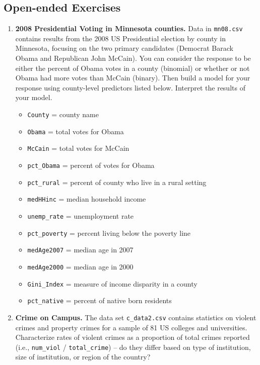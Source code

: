\documentclass[
]{krantz}
\providecommand{\tightlist}{%
  \setlength{\itemsep}{0pt}\setlength{\parskip}{0pt}}
\begin{document}
\hypertarget{open-ended-exercises-1}{%
\subsection{Open-ended Exercises}\label{open-ended-exercises-1}}

\begin{enumerate}
\def\labelenumi{\arabic{enumi}.}
\item
  \textbf{2008 Presidential Voting in Minnesota counties.} Data in \texttt{mn08.csv} contains results from the 2008 US Presidential election by county in Minnesota, focusing on the two primary candidates (Democrat Barack Obama and Republican John McCain). You can consider the response to be either the percent of Obama votes in a county (binomial) or whether or not Obama had more votes than McCain (binary). Then build a model for your response using county-level predictors listed below. Interpret the results of your model.

  \begin{itemize}
  \tightlist
  \item
    \texttt{County} = county name
  \item
    \texttt{Obama} = total votes for Obama
  \item
    \texttt{McCain} = total votes for McCain
  \item
    \texttt{pct\_Obama} = percent of votes for Obama
  \item
    \texttt{pct\_rural} = percent of county who live in a rural setting
  \item
    \texttt{medHHinc} = median household income
  \item
    \texttt{unemp\_rate} = unemployment rate
  \item
    \texttt{pct\_poverty} = percent living below the poverty line
  \item
    \texttt{medAge2007} = median age in 2007
  \item
    \texttt{medAge2000} = median age in 2000
  \item
    \texttt{Gini\_Index} = measure of income disparity in a county
  \item
    \texttt{pct\_native} = percent of native born residents
  \end{itemize}
\item
  \textbf{Crime on Campus.} The data set \texttt{c\_data2.csv} contains statistics on violent crimes and property crimes for a sample of 81 US colleges and universities. Characterize rates of violent crimes as a proportion of total crimes reported (i.e., \texttt{num\_viol} / \texttt{total\_crime}) -- do they differ based on type of institution, size of institution, or region of the country?


\end{enumerate}
\end{document}
